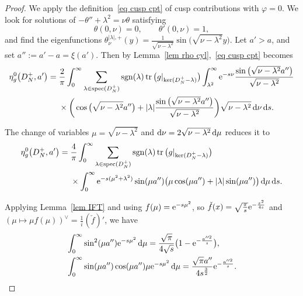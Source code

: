 \documentclass[pdftex]{sigma}%
\numberwithin{equation}{section}
\DeclareMathOperator{\tr}{tr}
\DeclareMathOperator{\spec}{spec}
\DeclareMathOperator{\sgn}{sgn}
\begin{document}
\begin{proof}We apply the definition~\eqref{eq cusp cpt} of cusp contributions with $\varphi = 0$.
We look for solutions of $-\theta''+\lambda^2=\nu\theta $ satisfying
\[
\theta(0,\nu)=0,\qquad \theta'(0,\nu)=1,
\]
 and find the eigenfunctions $\theta^{|\lambda|,+}_{\nu}(y) =\frac{1}{\sqrt{\nu-\lambda^2}}\sin\big(\sqrt{\nu-\lambda^2}y\big)$.
 Let $a'>a$, and set $a'':= {a'-a = \xi(a')}$. Then
 by Lemma~\ref{lem rho cyl},~\eqref{eq cusp cpt} becomes
\begin{align}
\eta^{0}_g\big(D_N^+, a'\big) ={}&\frac{2}{\pi} \int_{0}^{\infty}
\sum_{\lambda \in \spec(D_N^+)} \sgn(\lambda)\tr\big(g|_{\ker(D_N^+ - \lambda)}\big)
\int_{\lambda^2}^{\infty}
{\rm e}^{-s\nu}
\frac{\sin\big(\sqrt{\nu-\lambda^2}a''\big)}{\sqrt{\nu-\lambda^2}}\nonumber
\\
 &\times\bigg( \cos\big(\sqrt{\nu-\lambda^2}a''\big) +|\lambda| \frac{\sin\big(\sqrt{\nu-\lambda^2}a''\big)}{\sqrt{\nu-\lambda^2}}
 \bigg)\sqrt{\nu-\lambda^2}\, {\rm d}\nu \, {\rm d}s.
 \label{eq cusp contr cyl 1}
 \end{align}

The change of variables $\mu=\sqrt{\nu-\lambda^2}$ and ${\rm d}\nu=2\sqrt{\nu-\lambda^2}\,{\rm d}\mu$ reduces it to
\begin{align*}
\begin{split}
\eta^{0}_g\big(D_N^+, a'\big) ={}&\frac{4}{\pi} \int_{0}^{\infty}
\sum_{\lambda \in \spec(D_N^+)} \sgn(\lambda)\tr\big(g|_{\ker(D_N^+ - \lambda)}\big)
\\
&\times\int_{0}^{\infty}{\rm e}^{-s(\mu^2+\lambda^2)}\sin(\mu a'')
 \big( \mu\cos(\mu a'') +|\lambda| \sin(\mu a'') \big)\,{\rm d}\mu \, {\rm d}s.
 \end{split}
\end{align*}



Applying Lemma~\ref{lem IFT} and using $f(\mu)={\rm e}^{-s\mu^2}$, so $\check f(x)=\sqrt{\frac{\pi}{s}}{\rm e}^{-\frac{x^2}{4s}}$ and $(\mu \mapsto \mu f(\mu))^{\vee}=\frac{1}{i}(\check{f})'$, we have
\begin{align*}
&\int_0^{\infty}\sin^2(\mu a''){\rm e}^{-s\mu^2}\, {\rm d}\mu =\frac{\sqrt{\pi}}{4\sqrt{s}}\big(1-{\rm e}^{-\frac{a''^2}{s}}\big),
\\
&\int_0^{\infty}\sin(\mu a'')\cos(\mu a'')\mu {\rm e}^{-s\mu^2}\, {\rm d}\mu=\frac{\sqrt{\pi} a''}{4s^{\frac32}}{\rm e}^{-\frac{a''^2}{s}}.
\end{align*}


\end{proof}
\end{document}

